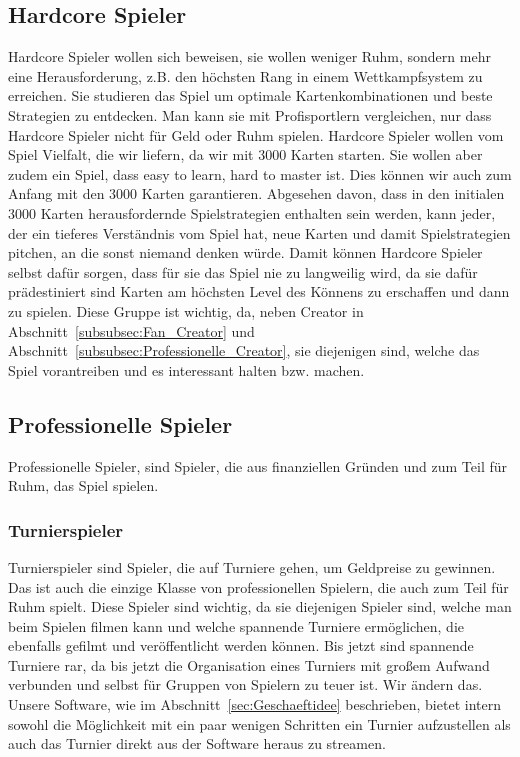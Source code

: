 \documentclass[fontsize=11, a4aper]{scrartcl}
\begin{document}
\subsection{Hardcore Spieler} \label{subsec:Hardcore_Spieler}

Hardcore Spieler wollen sich beweisen, sie wollen weniger Ruhm, sondern mehr eine Herausforderung, z.B. den höchsten Rang in einem Wettkampfsystem zu erreichen. Sie studieren das Spiel um optimale Kartenkombinationen und beste Strategien zu entdecken. Man kann sie mit Profisportlern vergleichen, nur dass Hardcore Spieler nicht für Geld oder Ruhm spielen. Hardcore Spieler wollen vom Spiel Vielfalt, die wir liefern, da wir mit 3000 Karten starten. Sie wollen aber zudem ein Spiel, dass \glqq easy to learn, hard to master\grqq{} ist. Dies können wir auch zum Anfang mit den 3000 Karten garantieren. Abgesehen davon, dass in den initialen 3000 Karten herausfordernde Spielstrategien enthalten sein werden, kann jeder, der ein tieferes Verständnis vom Spiel hat, neue Karten und damit Spielstrategien pitchen, an die sonst niemand denken würde. Damit können Hardcore Spieler selbst dafür sorgen, dass für sie das Spiel nie zu langweilig wird, da sie dafür prädestiniert sind Karten am höchsten Level des Könnens zu erschaffen und dann zu spielen. Diese Gruppe ist wichtig, da, neben \glqq Creator\grqq{} in Abschnitt~\ref{subsubsec:Fan_Creator} und Abschnitt~\ref{subsubsec:Professionelle_Creator}, sie diejenigen sind, welche das Spiel vorantreiben und es interessant halten bzw. machen.

\subsection{Professionelle Spieler}

Professionelle Spieler, sind Spieler, die aus finanziellen Gründen und zum Teil für Ruhm, das Spiel spielen.

\subsubsection{Turnierspieler} \label{subsubsec:Professioneller_Spieler_Turnierspieler}

Turnierspieler sind Spieler, die auf Turniere gehen, um Geldpreise zu gewinnen. Das ist auch die einzige Klasse von professionellen Spielern, die auch zum Teil für Ruhm spielt. Diese Spieler sind wichtig, da sie diejenigen Spieler sind, welche man beim Spielen filmen kann und welche spannende Turniere ermöglichen, die ebenfalls gefilmt und veröffentlicht werden können. Bis jetzt sind spannende Turniere rar, da bis jetzt die Organisation eines Turniers mit großem Aufwand verbunden und selbst für Gruppen von Spielern zu teuer ist. Wir ändern das. Unsere Software, wie im Abschnitt~\ref{sec:Geschaeftidee} beschrieben, bietet intern sowohl die Möglichkeit mit ein paar wenigen Schritten ein Turnier aufzustellen als auch das Turnier direkt aus der Software heraus zu streamen.
\end{document}
